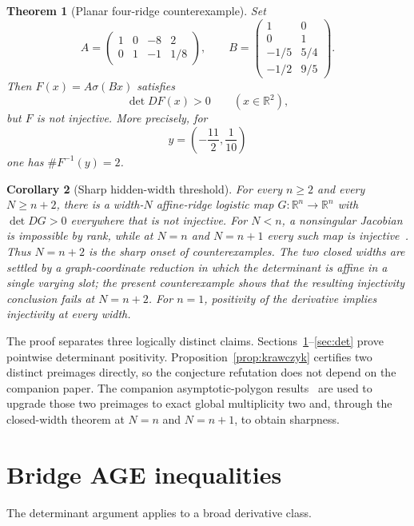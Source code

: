 \documentclass[11pt]{article}
\newtheorem{theorem}{Theorem}[section]
\newtheorem{corollary}[theorem]{Corollary}
\theoremstyle{remark}
\newcommand{\R}{\mathbb R}
\begin{document}
\begin{theorem}[Planar four-ridge counterexample]\label{thm:main}
Set
\[
 A=\begin{pmatrix}
 1&0&-8&2\\
 0&1&-1&1/8
 \end{pmatrix},\qquad
 B=\begin{pmatrix}
 1&0\\
 0&1\\
 -1/5&5/4\\
 -1/2&9/5
 \end{pmatrix}.
\]
Then $F(x)=A\sigma(Bx)$ satisfies
\[
 \det DF(x)>0\qquad(x\in\R^2),
\]
but $F$ is not injective. More precisely, for
\[
 y=\left(-\frac{11}{2},\frac{1}{10}\right)
\]
one has $\#F^{-1}(y)=2$.
\end{theorem}

\begin{corollary}[Sharp hidden-width threshold]\label{cor:sharp}
For every $n\ge2$ and every $N\ge n+2$, there is a width-$N$ affine-ridge logistic map $G:\R^n\to\R^n$ with $\det DG>0$ everywhere that is not injective. For $N<n$, a nonsingular Jacobian is impossible by rank, while at $N=n$ and $N=n+1$ every such map is injective~\cite[Thm.~3.2]{DixonPolygon}. Thus $N=n+2$ is the sharp onset of counterexamples. The two closed widths are settled by a graph-coordinate reduction in which the determinant is affine in a single varying slot; the present counterexample shows that the resulting injectivity conclusion fails at $N=n+2$. For $n=1$, positivity of the derivative implies injectivity at every width.
\end{corollary}

The proof separates three logically distinct claims. Sections~\ref{sec:age}--\ref{sec:det} prove pointwise determinant positivity. Proposition~\ref{prop:krawczyk} certifies two distinct preimages directly, so the conjecture refutation does not depend on the companion paper. The companion asymptotic-polygon results~\cite{DixonPolygon} are used to upgrade those two preimages to exact global multiplicity two and, through the closed-width theorem at $N=n$ and $N=n+1$, to obtain sharpness.

\section{Bridge AGE inequalities}\label{sec:age}
The determinant argument applies to a broad derivative class.
\end{document}
